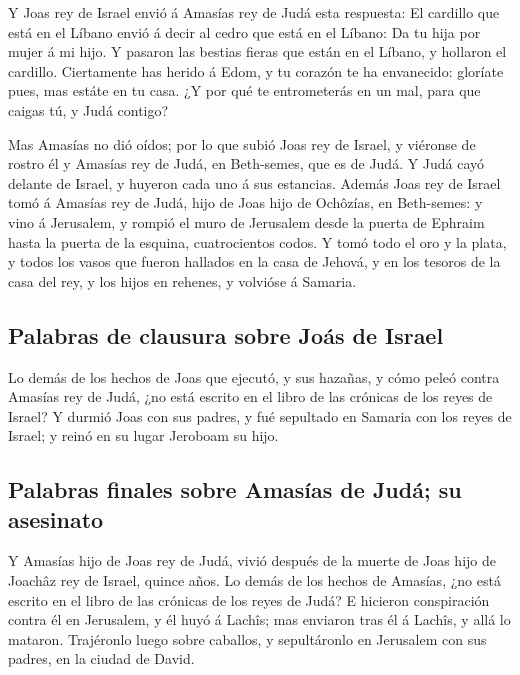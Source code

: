  Y Joas rey de Israel envió á Amasías rey de Judá esta
respuesta: El cardillo que está en el Líbano envió á decir al cedro que
está en el Líbano: Da tu hija por mujer á mi hijo. Y pasaron las bestias
fieras que están en el Líbano, y hollaron el cardillo. 
Ciertamente has herido á Edom, y tu corazón te ha envanecido: gloríate
pues, mas estáte en tu casa. ¿Y por qué te entrometerás en un mal, para
que caigas tú, y Judá contigo?

 Mas Amasías no dió oídos; por lo que subió Joas rey de
Israel, y viéronse de rostro él y Amasías rey de Judá, en Beth-semes,
que es de Judá.  Y Judá cayó delante de Israel, y huyeron
cada uno á sus estancias.  Además Joas rey de Israel tomó á
Amasías rey de Judá, hijo de Joas hijo de Ochôzías, en Beth-semes: y
vino á Jerusalem, y rompió el muro de Jerusalem desde la puerta de
Ephraim hasta la puerta de la esquina, cuatrocientos codos.
 Y tomó todo el oro y la plata, y todos los vasos que
fueron hallados en la casa de Jehová, y en los tesoros de la casa del
rey, y los hijos en rehenes, y volvióse á Samaria.

\hypertarget{palabras-de-clausura-sobre-jouxe1s-de-israel}{%
\subsection{Palabras de clausura sobre Joás de
Israel}\label{palabras-de-clausura-sobre-jouxe1s-de-israel}}

 Lo demás de los hechos de Joas que ejecutó, y sus hazañas,
y cómo peleó contra Amasías rey de Judá, ¿no está escrito en el libro de
las crónicas de los reyes de Israel?  Y durmió Joas con sus
padres, y fué sepultado en Samaria con los reyes de Israel; y reinó en
su lugar Jeroboam su hijo.

\hypertarget{palabras-finales-sobre-amasuxedas-de-juduxe1-su-asesinato}{%
\subsection{Palabras finales sobre Amasías de Judá; su
asesinato}\label{palabras-finales-sobre-amasuxedas-de-juduxe1-su-asesinato}}

 Y Amasías hijo de Joas rey de Judá, vivió después de la
muerte de Joas hijo de Joachâz rey de Israel, quince años. 
Lo demás de los hechos de Amasías, ¿no está escrito en el libro de las
crónicas de los reyes de Judá?  E hicieron conspiración
contra él en Jerusalem, y él huyó á Lachîs; mas enviaron tras él á
Lachîs, y allá lo mataron.  Trajéronlo luego sobre
caballos, y sepultáronlo en Jerusalem con sus padres, en la ciudad de
David.

